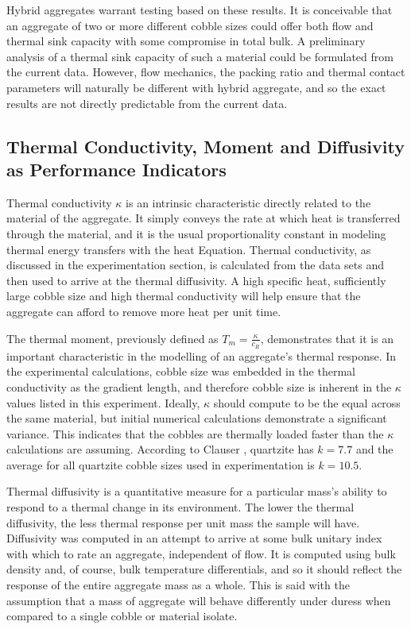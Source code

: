 Hybrid aggregates warrant testing based on these results. It is conceivable that an aggregate of two or more different cobble sizes could offer both flow and thermal sink capacity with some compromise in total bulk. A preliminary analysis of a thermal sink capacity of such a material could be formulated from the current data. However, flow mechanics, the packing ratio and thermal contact parameters will naturally be different with hybrid aggregate, and so the exact results are not directly predictable from the current data.

\subsection{Thermal Conductivity, Moment and Diffusivity as Performance Indicators}
Thermal conductivity $\kappa$ is an intrinsic characteristic directly related to the material of the aggregate. It simply conveys the rate at which heat is transferred through the material, and it is the usual proportionality constant in modeling thermal energy transfers with the heat Equation. Thermal conductivity, as discussed in the experimentation section, is calculated from the data sets and then used to arrive at the thermal diffusivity. A high specific heat, sufficiently large cobble size and high thermal conductivity will help ensure that the aggregate can afford to remove more heat per unit time. 

The thermal moment, previously defined as $T_{m}=\frac{\kappa}{c_{R}}$, demonstrates that it is an important characteristic in the modelling of an aggregate's thermal response. In the experimental calculations, cobble size was embedded in the thermal conductivity as the gradient length, and therefore cobble size is inherent in the $\kappa$ values listed in this experiment. Ideally, $\kappa$ should compute to be the equal across the same material, but initial numerical calculations demonstrate a significant variance. This indicates that the cobbles are thermally loaded faster than the $\kappa$ calculations are assuming. According to Clauser \citep{kRocks}, quartzite has $k=7.7$ and the average for all quartzite cobble sizes used in experimentation is $k=10.5$. 

Thermal diffusivity is a quantitative measure for a particular mass's ability to respond to a thermal change in its environment. The lower the thermal diffusivity, the less thermal response per unit mass the sample will have. Diffusivity was computed in an attempt to arrive at some bulk unitary index with which to rate an aggregate, independent of flow. It is computed using bulk density and, of course, bulk temperature differentials, and so it should reflect the response of the entire aggregate mass as a whole. This is said with the assumption that a mass of aggregate will behave differently under duress when compared to a single cobble or material isolate.

